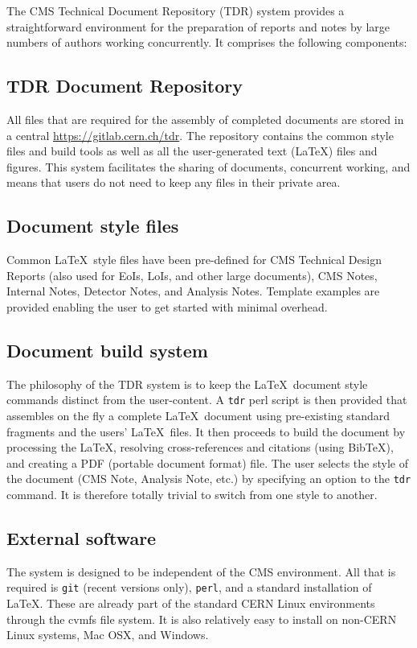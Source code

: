 The CMS Technical Document Repository (TDR) system provides a straightforward
environment for the preparation of reports and notes by
large numbers of authors working concurrently.
It comprises the following components:
%
\subsection{TDR Document Repository}

All files that are required for the assembly of completed documents
are stored in a central \href{CMS tdr GitLab repository}{https://gitlab.cern.ch/tdr}.
The repository contains the common style files and build tools as well
as all the user-generated text (\LaTeX) files and figures.
This system facilitates the sharing of documents, concurrent working, and
means that users do not need to keep any files in their private area.


\subsection{Document style files}
%
Common \LaTeX\ style files have been pre-defined for CMS Technical Design Reports
(also used for EoIs, LoIs, and other large documents), CMS Notes, Internal Notes, Detector Notes, and
Analysis Notes.
Template examples are provided enabling the user to get started
with minimal overhead.


\subsection{Document build system}
%
The philosophy of the TDR system is to keep the \LaTeX\ document style
commands distinct from the user-content.
A \texttt{tdr} perl script is then provided that assembles on the fly
a complete \LaTeX\ document using pre-existing standard fragments
and the users' \LaTeX\ files.
It then proceeds to build the document by processing the \LaTeX,
resolving cross-references and citations (using BibTeX), and
creating a PDF (portable document format) file.
The user selects the style of the document (CMS Note, Analysis Note, etc.)
by specifying an option to the \texttt{tdr} command.
It is therefore totally trivial to switch from one style to another.

\subsection{External software}
%
The system is designed to be independent of the CMS environment.
All that is required is \texttt{git} (recent versions only), \texttt{perl}, and a standard
installation of \LaTeX.
These are already part of the standard CERN Linux environments through the cvmfs file system. It is also relatively easy to install on non-CERN Linux systems, Mac OSX, and Windows.

